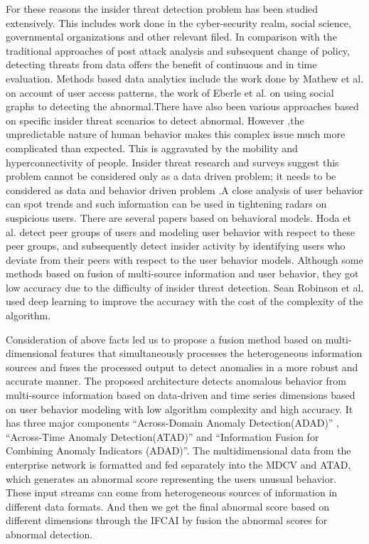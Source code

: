 \documentclass[conference]{IEEEtran}
\begin{document}
For these reasons the insider threat detection problem has been studied extensively\cite{b4}. This includes work done in the cyber-security realm, social science, governmental organizations and other relevant filed. In comparison with the traditional approaches of post attack analysis and subsequent change of policy, detecting threats from data offers the benefit of continuous and in time evaluation. Methods based data analytics include the work done by Mathew et al.\cite{b5} on account of user access patterns, the work of Eberle et al. \cite{b6} on using social graphs to detecting the abnormal.There have also been various approaches based on specific insider threat scenarios to detect abnormal\cite{b7}\cite{b8}. However ,the unpredictable nature of human behavior makes this complex issue much more complicated than expected. This is aggravated by the mobility and hyperconnectivity of people. Insider threat research and surveys suggest this problem cannot be considered only as a data driven problem; it needs to be considered as data and behavior driven problem \cite{b9}.A close analysis of user behavior can spot trends and such information can be used in tightening radars on suspicious users. There are several papers based on behavioral models\cite{b10}\cite{b11}\cite{b12}. Hoda et al. \cite{b13}detect peer groups of users and modeling user behavior with respect to these peer groups, and subsequently detect insider activity by identifying users who deviate from their peers with respect to the user behavior models. Although some methods based on fusion of multi-source information and user behavior\cite{b14}, they got low accuracy due to the difficulty of insider threat detection. Sean Robinson et al.\cite{b15} used deep learning to improve the accuracy with the cost of the complexity of the algorithm.

Consideration of above facts led us to propose a fusion method based on multi-dimensional features that simultaneously processes the heterogeneous information sources and fuses the processed output to detect anomalies in a more robust and accurate manner. The proposed architecture detects anomalous behavior from multi-source information based on data-driven and time series dimensions based on user behavior modeling with low algorithm complexity and high accuracy. It has three major components “Across-Domain Anomaly Detection(ADAD)” , “Across-Time Anomaly Detection(ATAD)” and “Information Fusion for Combining Anomaly Indicators (ADAD)”. The multidimensional data from the enterprise network is formatted and fed separately into the MDCV and ATAD, which generates an abnormal score representing the users unusual behavior. These input streams can come from heterogeneous sources of information in different data formats. And then we get the final abnormal score based on different dimensions through the IFCAI by fusion the abnormal scores  for abnormal detection.
\end{document}
